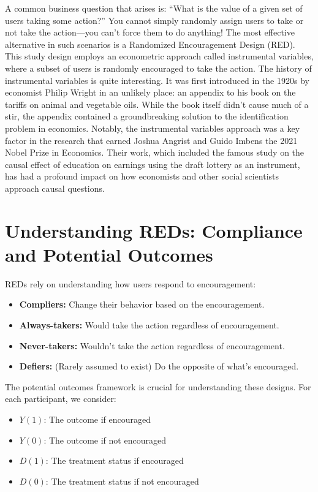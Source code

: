 \documentclass[
  letterpaper,
  DIV=11,
  numbers=noendperiod]{scrreprt}
\providecommand{\tightlist}{%
  \setlength{\itemsep}{0pt}\setlength{\parskip}{0pt}}\usepackage{longtable,booktabs,array}
\begin{document}
A common business question that arises is: ``What is the value of a
given set of users taking some action?'' You cannot simply randomly
assign users to take or not take the action---you can't force them to do
anything! The most effective alternative in such scenarios is a
Randomized Encouragement Design (RED). This study design employs an
econometric approach called instrumental variables, where a subset of
users is randomly encouraged to take the action. The history of
instrumental variables is quite interesting. It was first introduced in
the 1920s by economist Philip Wright in an unlikely place: an appendix
to his book on the tariffs on animal and vegetable oils. While the book
itself didn't cause much of a stir, the appendix contained a
groundbreaking solution to the identification problem in economics.
Notably, the instrumental variables approach was a key factor in the
research that earned Joshua Angrist and Guido Imbens the 2021 Nobel
Prize in Economics. Their work, which included the famous study on the
causal effect of education on earnings using the draft lottery as an
instrument, has had a profound impact on how economists and other social
scientists approach causal questions.

\section{Understanding REDs: Compliance and Potential
Outcomes}\label{understanding-reds-compliance-and-potential-outcomes}

REDs rely on understanding how users respond to encouragement:

\begin{itemize}
\tightlist
\item
  \textbf{Compliers:} Change their behavior based on the encouragement.
\item
  \textbf{Always-takers:} Would take the action regardless of
  encouragement.
\item
  \textbf{Never-takers:} Wouldn't take the action regardless of
  encouragement.
\item
  \textbf{Defiers:} (Rarely assumed to exist) Do the opposite of what's
  encouraged.
\end{itemize}

The potential outcomes framework is crucial for understanding these
designs. For each participant, we consider:

\begin{itemize}
\tightlist
\item
  \(Y(1)\): The outcome if encouraged
\item
  \(Y(0)\): The outcome if not encouraged
\item
  \(D(1)\): The treatment status if encouraged
\item
  \(D(0)\): The treatment status if not encouraged
\end{itemize}
\end{document}
